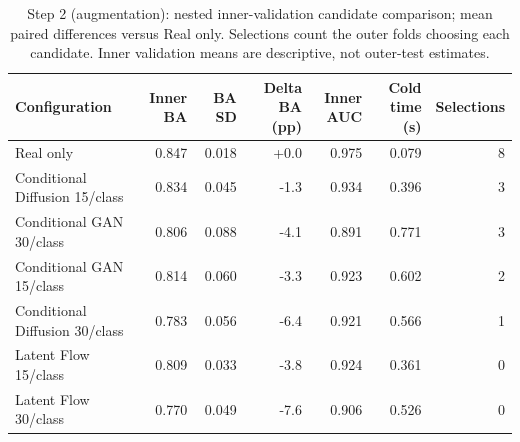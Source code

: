 \begin{table}[t]
\centering
\caption{Step 2 (augmentation): nested inner-validation candidate comparison; mean paired differences versus Real only. Selections count the outer folds choosing each candidate. Inner validation means are descriptive, not outer-test estimates.}
\label{tab:step2_candidates}
\footnotesize
\setlength{\tabcolsep}{4pt}
\begin{tabular}{lrrrrrr}
\toprule
Configuration & Inner BA & BA SD & Delta BA (pp) & Inner AUC & Cold time (s) & Selections \\
\midrule
Real only & 0.847 & 0.018 & +0.0 & 0.975 & 0.079 & 8 \\
Conditional Diffusion 15/class & 0.834 & 0.045 & -1.3 & 0.934 & 0.396 & 3 \\
Conditional GAN 30/class & 0.806 & 0.088 & -4.1 & 0.891 & 0.771 & 3 \\
Conditional GAN 15/class & 0.814 & 0.060 & -3.3 & 0.923 & 0.602 & 2 \\
Conditional Diffusion 30/class & 0.783 & 0.056 & -6.4 & 0.921 & 0.566 & 1 \\
Latent Flow 15/class & 0.809 & 0.033 & -3.8 & 0.924 & 0.361 & 0 \\
Latent Flow 30/class & 0.770 & 0.049 & -7.6 & 0.906 & 0.526 & 0 \\
\bottomrule
\end{tabular}
\end{table}
